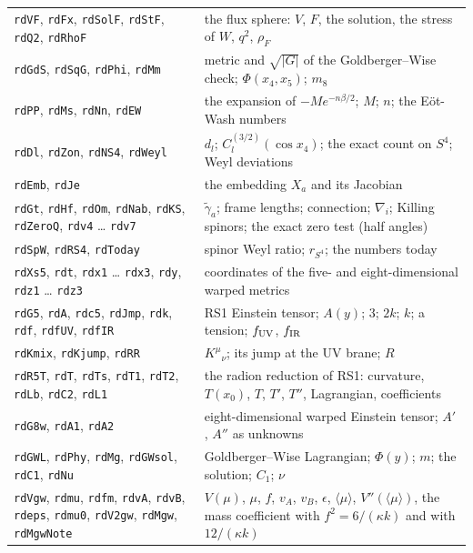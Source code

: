 \documentclass[10pt,a4paper]{article}
\begin{document}
{\begin{longtable}{>{\raggedright\arraybackslash}p{}>{\raggedright\arraybackslash}p{}}
\texttt{rdVF}, \texttt{rdFx}, \texttt{rdSolF}, \texttt{rdStF}, \texttt{rdQ2}, \texttt{rdRhoF} & the flux sphere: $V$, $F$, the solution, the stress of $W$, $q^2$, $\rho_F$ \\
\texttt{rdGdS}, \texttt{rdSqG}, \texttt{rdPhi}, \texttt{rdMm} & metric and $\sqrt{|G|}$ of the Goldberger–Wise check; $\Phi(x_4,x_5)$; $m_8$ \\
\texttt{rdPP}, \texttt{rdMs}, \texttt{rdNn}, \texttt{rdEW} & the expansion of $-Me^{-n\beta/2}$; $M$; $n$; the Eöt-Wash numbers \\
\texttt{rdDl}, \texttt{rdZon}, \texttt{rdNS4}, \texttt{rdWeyl} & $d_l$; $C_l^{(3/2)}(\cos x_4)$; the exact count on $S^4$; Weyl deviations \\
\texttt{rdEmb}, \texttt{rdJe} & the embedding $X_a$ and its Jacobian \\
\texttt{rdGt}, \texttt{rdHf}, \texttt{rdOm}, \texttt{rdNab}, \texttt{rdKS}, \texttt{rdZeroQ}, \texttt{rdv4} … \texttt{rdv7} & $\tilde\gamma_a$; frame lengths; connection; $\nabla_i$; Killing spinors; the exact zero test (half angles) \\
\texttt{rdSpW}, \texttt{rdRS4}, \texttt{rdToday} & spinor Weyl ratio; $r_{S^4}$; the numbers today \\
\texttt{rdXs5}, \texttt{rdt}, \texttt{rdx1} … \texttt{rdx3}, \texttt{rdy}, \texttt{rdz1} … \texttt{rdz3} & coordinates of the five- and eight-dimensional warped metrics \\
\texttt{rdG5}, \texttt{rdA}, \texttt{rdc5}, \texttt{rdJmp}, \texttt{rdk}, \texttt{rdf}, \texttt{rdfUV}, \texttt{rdfIR} & RS1 Einstein tensor; $A(y)$; $3$; $2k$; $k$; a tension; $f_{\rm UV}$, $f_{\rm IR}$ \\
\texttt{rdKmix}, \texttt{rdKjump}, \texttt{rdRR} & $K^\mu{}_\nu$; its jump at the UV brane; $R$ \\
\texttt{rdR5T}, \texttt{rdT}, \texttt{rdTs}, \texttt{rdT1}, \texttt{rdT2}, \texttt{rdLb}, \texttt{rdC2}, \texttt{rdL1} & the radion reduction of RS1: curvature, $T(x_0)$, $T$, $T'$, $T''$, Lagrangian, coefficients \\
\texttt{rdG8w}, \texttt{rdA1}, \texttt{rdA2} & eight-dimensional warped Einstein tensor; $A'$, $A''$ as unknowns \\
\texttt{rdGWL}, \texttt{rdPhy}, \texttt{rdMg}, \texttt{rdGWsol}, \texttt{rdC1}, \texttt{rdNu} & Goldberger–Wise Lagrangian; $\Phi(y)$; $m$; the solution; $C_1$; $\nu$ \\
\texttt{rdVgw}, \texttt{rdmu}, \texttt{rdfm}, \texttt{rdvA}, \texttt{rdvB}, \texttt{rdeps}, \texttt{rdmu0}, \texttt{rdV2gw}, \texttt{rdMgw}, \texttt{rdMgwNote} & $V(\mu)$, $\mu$, $f$, $v_A$, $v_B$, $\epsilon$, $\langle\mu\rangle$, $V''(\langle\mu\rangle)$, the mass coefficient with $f^2=6/(\kappa k)$ and with $12/(\kappa k)$ \\

\end{longtable}}
\end{document}
